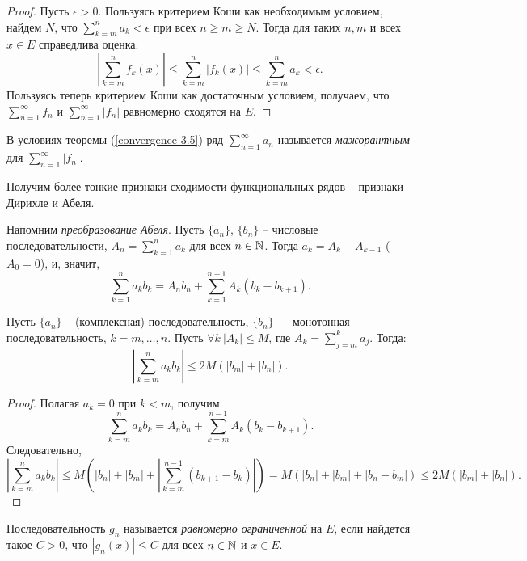 \begin{proof}
    Пусть $\epsilon > 0$. Пользуясь критерием Коши как необходимым условием, найдем $N$, что $\sum_{k = m}^{n} a_{k} < \epsilon$ при всех $n \geq m \geq N$. Тогда для таких $n, m$ и всех $x \in E$ справедлива оценка:
    \[\left| \sum_{k = m}^{n} f_{k}(x)\right| \leq \sum_{k = m}^{n} |f_{k}(x)| \leq \sum_{k = m}^{n} a_{k} < \epsilon.\]
    Пользуясь теперь критерием Коши как достаточным условием, получаем, что $\sum_{n=1}^{\infty} f_{n}$ и $\sum_{n=1}^{\infty} |f_{n}|$ равномерно сходятся на $E$.
\end{proof}

\begin{note}
    В условиях теоремы (\ref{convergence-3.5}) ряд $\sum_{n = 1}^{\infty} a_{n}$ называется \textit{мажорантным} для $\sum_{n = 1}^{\infty}|f_{n}|$.
\end{note}

Получим более тонкие признаки сходимости функциональных рядов -- признаки Дирихле и Абеля.

\begin{reminder}
    Напомним \emph{преобразование Абеля}.
    Пусть $\{a_n\}$, $\{b_n\}$ -- числовые последовательности, $A_n = \sum_{k=1}^n a_k$ для всех $n \in \mathbb{N}$. Тогда $a_k = A_k - A_{k-1}$ ($A_0 = 0$), и, значит,
    \[
        \sum_{k=1}^{n} a_k b_k = A_{n} b_{n} + \sum_{k = 1}^{n - 1} A_{k}(b_{k} - b_{k + 1}).
    \]
\end{reminder}

\begin{reminder}
    Пусть $\{a_n\}$ -- (комплексная) последовательность, $\{b_n\}$ --- монотонная последовательность, $k = m, \ldots, n$. Пусть $\forall k \ |A_k| \le M$, где $A_{k} = \sum_{j = m}^{k} a_{j}$. Тогда:
    \[\left|\sum_{k=m}^n a_k b_k \right| \le 2M(|b_m| + |b_n|).\]

    \begin{proof}
        Полагая $a_{k} = 0$ при $k < m$, получим:
        \[\sum_{k=m}^{n} a_k b_k = A_{n} b_{n} + \sum_{k = m}^{n - 1} A_{k}(b_{k} - b_{k + 1}).\]
        Следовательно,
        \[ \left| \sum_{k=m}^n a_k b_k \right| \le M \left(|b_n| + |b_m| + \left| \sum_{k = m}^{n - 1} (b_{k+1} - b_k) \right| \right) = M \left(|b_n| + |b_m| + |b_n - b_m| \right) \leq 2M(|b_m| + |b_n|).\]
    \end{proof}
\end{reminder}

\begin{definition}
    Последовательность $g_{n}$ называется \textit{равномерно ограниченной} на $E$, если найдется такое $C > 0$, что $|g_{n}(x)| \leq C$ для всех $n \in \mathbb{N}$ и $x \in E$.
\end{definition}


